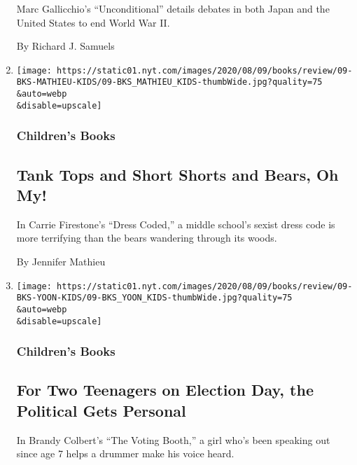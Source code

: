 \begin{enumerate}
  Marc Gallicchio's ``Unconditional'' details debates in both Japan and
  the United States to end World War II.

  By Richard J. Samuels
\item
  \href{/2020/08/01/books/review/carrie-firestone-dress-coded.html}{}

  \texttt{[image: https://static01.nyt.com/images/2020/08/09/books/review/09-BKS-MATHIEU-KIDS/09-BKS\_MATHIEU\_KIDS-thumbWide.jpg?quality=75\\\&auto=webp\\\&disable=upscale]}

  \hypertarget{childrens-books}{%
  \subsubsection{Children's Books}\label{childrens-books}}

  \hypertarget{tank-tops-and-short-shorts-and-bears-oh-my}{%
  \subsection{Tank Tops and Short Shorts and Bears, Oh
  My!}\label{tank-tops-and-short-shorts-and-bears-oh-my}}

  In Carrie Firestone's ``Dress Coded,'' a middle school's sexist dress
  code is more terrifying than the bears wandering through its woods.

  By Jennifer Mathieu
\item
  \href{/2020/08/01/books/review/brandy-colbert-the-voting-booth.html}{}

  \texttt{[image: https://static01.nyt.com/images/2020/08/09/books/review/09-BKS-YOON-KIDS/09-BKS\_YOON\_KIDS-thumbWide.jpg?quality=75\\\&auto=webp\\\&disable=upscale]}

  \hypertarget{childrens-books-1}{%
  \subsubsection{Children's Books}\label{childrens-books-1}}

  \hypertarget{for-two-teenagers-on-election-day-the-political-gets-personal}{%
  \subsection{For Two Teenagers on Election Day, the Political Gets
  Personal}\label{for-two-teenagers-on-election-day-the-political-gets-personal}}

  In Brandy Colbert's ``The Voting Booth,'' a girl who's been speaking
  out since age 7 helps a drummer make his voice heard.


\end{enumerate}

